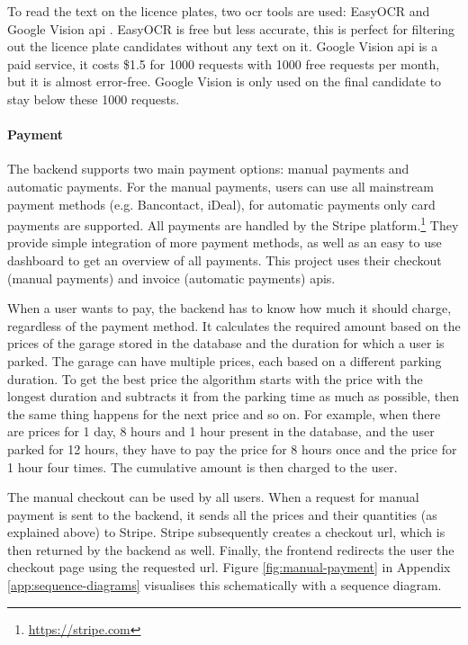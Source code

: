\ind To read the text on the licence plates, two \ac{ocr} tools are used: EasyOCR \cite{easyocr} and Google Vision \ac{api} \cite{googlevision}. EasyOCR is free but less accurate, this is perfect for filtering out the licence plate candidates without any text on it. Google Vision \ac{api} is a paid service, it costs \$1.5 for 1000 requests with 1000 free requests per month, but it is almost error-free. Google Vision is only used on the final candidate to stay below these 1000 requests.

\paragraph{Payment}\label{sec:Payment}
The backend supports two main payment options: manual payments and automatic payments. For the manual payments, users can use all mainstream payment methods (e.g. Bancontact, iDeal), for automatic payments only card payments are supported. All payments are handled by the Stripe platform.\footnote{\url{https://stripe.com}} They provide simple integration of more payment methods, as well as an easy to use dashboard to get an overview of all payments. This project uses their checkout (manual payments) and invoice (automatic payments) \acp{api}. 

\ind When a user wants to pay, the backend has to know how much it should charge, regardless of the payment method. It calculates the required amount based on the prices of the garage stored in the database and the duration for which a user is parked. The garage can have multiple prices, each based on a different parking duration. To get the best price the algorithm starts with the price with the longest duration and subtracts it from the parking time as much as possible, then the same thing happens for the next price and so on. For example, when there are prices for 1 day, 8 hours and 1 hour present in the database, and the user parked for 12 hours, they have to pay the price for 8 hours once and the price for 1 hour four times. The cumulative amount is then charged to the user.

\ind The manual checkout can be used by all users. When a request for manual payment is sent to the backend, it sends all the prices and their quantities (as explained above) to Stripe. Stripe subsequently creates a checkout \ac{url}, which is then returned by the backend as well. Finally, the frontend redirects the user the checkout page using the requested \ac{url}. Figure \ref{fig:manual-payment} in Appendix \ref{app:sequence-diagrams} visualises this schematically with a sequence diagram.

